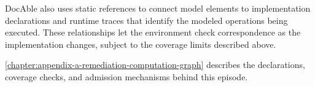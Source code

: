 DocAble also uses static references to connect model elements to implementation declarations and runtime traces that identify the modeled operations being executed. These relationships let the environment check correspondence as the implementation changes, subject to the coverage limits described above.


\autoref{chapter:appendix-a-remediation-computation-graph} describes the declarations, coverage checks, and admission mechanisms behind this episode.
